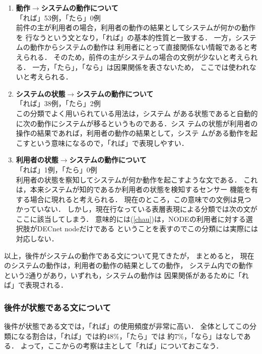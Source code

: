 \def\labelenumi{}
\def\theenumi{}
\begin{enumerate}
\item {\bf 動作$\rightarrow$システムの動作について}\label{act-sysact}\\
「れば」53例，「たら」0例\\
前件の{\dg 主}が利用者の場合，利用者の動作の結果としてシステムが何かの動作を
行なうという文となり，「れば」の基本的性質と一致する．
一方，システムの動作からシステムの動作は
利用者にとって直接関係ない情報であると考えられる．
そのため，前件の{\dg 主}がシステムの場合の文例が少ないと考えられる．
一方，「たら」，「なら」は因果関係を表さないため，
ここでは使われないと考えられる．

\item {\bf システムの状態$\rightarrow$システムの動作について}\label{sysst-sysact}\\
「れば」38例，「たら」2例\\この分類でよく用いられている用法は，システム
がある状態であると自動的に次の動作にシステムが移るというものである．シス
テムの状態が利用者の操作の結果であれば，利用者の動作の結果として，システ
ムがある動作を起こすという意味になるので，「れば」で表現しやすい．

\item {\bf 利用者の状態$\rightarrow$システムの動作について}\label{usrst-sysact}\\
「れば」1例，「たら」0例\\
利用者の状態を察知してシステムが何か動作を起こすような文である．
これは，本来システムが知的であるか利用者の状態を検知するセンサー
機能を有する場合に現れると考えられる．
現在のところ，この意味での文例は見つかっていない．
しかし，現在行なっている表層表現による分類では次の文がここに該当してしまう．
意味的には(\ref{chau})は，NODEの利用者に対する選択肢がDECnet nodeだけである
ということを表すのでこの分類には実際には対応しない．
\end{enumerate}
以上，後件がシステムの動作である文について見てきたが，
まとめると，
現在のシステムの動作は，利用者の動作の結果としての動作，
システム内での動作という2通りがあり，いずれも，システムの動作は
因果関係があるために「れば」で表現される．

\subsubsection{後件が状態である文について}
後件が状態である文では，「れば」の使用頻度が非常に高い．
全体としてこの分類になる割合は，「れば」では約48\%，「たら」では
約7\%，「なら」はなしである．
よって，ここからの考察は主として「れば」についておこなう．

